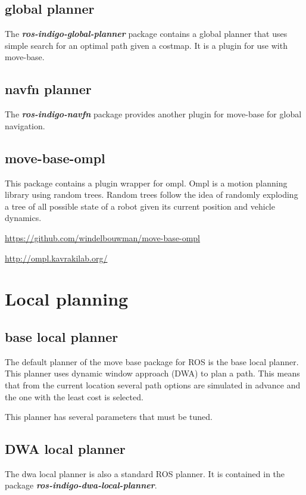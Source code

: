 \documentclass[a4paper]{article}
\newcommand{\rospackage}[1]{\textbf{\textit{#1}}}
\begin{document}
\subsection{global planner}
The \rospackage{ros-indigo-global-planner} package contains a global planner that uses simple search
for an optimal path given a costmap. It is a plugin for use with move-base.

\subsection{navfn planner}
The \rospackage{ros-indigo-navfn} package provides another plugin for move-base for global navigation.

\subsection{move-base-ompl}
This package contains a plugin wrapper for ompl. Ompl is a motion planning library using random trees.
Random trees follow the idea of randomly exploding a tree of all possible state of a robot
given its current position and vehicle dynamics.

\url{https://github.com/windelbouwman/move-base-ompl}

\url{http://ompl.kavrakilab.org/}

\section{Local planning}

\subsection{base local planner}

The default planner of the move base package for ROS is the base local planner.
This planner uses dynamic window approach (DWA) to plan a path. This means that from the current 
location several path options are simulated in advance and the one with the least cost is selected.

This planner has several parameters that must be tuned.

\subsection{DWA local planner}
The dwa local planner is also a standard ROS planner. It is contained in the package
\rospackage{ros-indigo-dwa-local-planner}.
\end{document}
